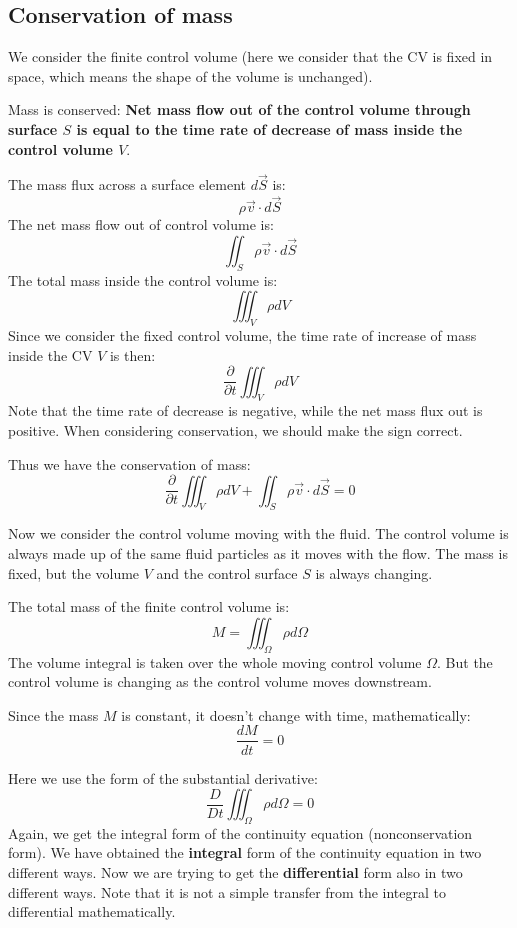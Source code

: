 \documentclass[11pt]{article} %
\begin{document}
\subsection{Conservation of mass}
\hspace{5mm} We consider the finite control volume (here we consider that the CV is fixed in space, which means the shape of the volume is unchanged).\par
Mass is conserved: \textbf{Net mass flow out of the control volume through surface $S$ is equal to the time rate of decrease of mass inside the control volume $V$}.\par
The mass flux across a surface element $d\vec{S}$ is:
$$
\rho\vec{v}\cdot d\vec{S}
$$
The net mass flow out of control volume is:
$$
\iint_{S}\rho\vec{v}\cdot d\vec{S}
$$
The total mass inside the control volume is:
$$
\iiint_{V} \rho dV
$$
Since we consider the fixed control volume, the time rate of increase of mass inside the CV $V$ is then:
$$
\frac{\partial}{\partial t}\iiint_{V} \rho dV
$$Note that the time rate of decrease is negative, while the net mass flux out is positive. When considering conservation, we should make the sign correct.\par
Thus we have the conservation of mass:
\begin{equation}
\frac{\partial}{\partial t}\iiint_{V} \rho dV + \iint_{S}\rho\vec{v}\cdot d\vec{S} = 0
\end{equation}\par
Now we consider the control volume moving with the fluid. The control volume is always made up of the same fluid particles as it moves with the flow. The mass is fixed, but the volume $V$ and the control surface $S$ is always changing.\par
The total mass of the finite control volume is:
$$
M = \iiint_{\Omega} \rho d\Omega
$$
The volume integral is taken over the whole moving control volume $\Omega$. But the control volume is changing as the control volume moves downstream.\par
Since the mass $M$ is constant, it doesn't change with time, mathematically:
$$
\frac{dM}{dt} = 0
$$\par
Here we use the form of the substantial derivative:
\begin{equation}
\frac{D}{Dt} \iiint_{\Omega} \rho d\Omega =0
\end{equation}
Again, we get the integral form of the continuity equation (nonconservation form). We have obtained the \textbf{integral} form of the continuity equation in two different ways. Now we are trying to get the \textbf{differential} form also in two different ways. Note that it is not a simple transfer from the integral to differential mathematically. \par
\end{document}

